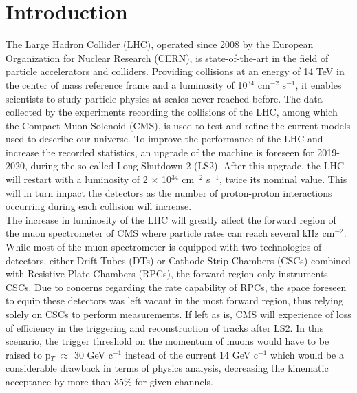 \chapter*{Introduction}
\label{chap:0-4-introduction}

  \vspace{2cm}

  The Large Hadron Collider (LHC), operated since 2008 by the European Organization for Nuclear Research (CERN), is state-of-the-art in the field of particle accelerators and colliders. Providing collisions at an energy of 14 TeV in the center of mass reference frame and a luminosity of 10$^{34}$ cm$^{-2}$ s$^{-1}$, it enables scientists to study particle physics at scales never reached before. The data collected by the experiments recording the collisions of the LHC, among which the Compact Muon Solenoid (CMS), is used to test and refine the current models used to describe our universe. To improve the performance of the LHC and increase the recorded statistics, an upgrade of the machine is foreseen for 2019-2020, during the so-called Long Shutdown 2 (LS2). After this upgrade, the LHC will restart with a luminosity of 2 $\times$ 10$^{34}$ cm$^{-2}$ s$^{-1}$, twice its nominal value. This will in turn impact the detectors as the number of proton-proton interactions occurring during each collision will increase. \\

  The increase in luminosity of the LHC will greatly affect the forward region of the muon spectrometer of CMS where particle rates can reach several kHz cm$^{-2}$. While most of the muon  spectrometer is equipped with two technologies of detectors, either Drift Tubes (DTs) or Cathode Strip Chambers (CSCs) combined with Resistive Plate Chambers (RPCs), the forward region only instruments CSCs. Due to concerns regarding the rate capability of RPCs, the space foreseen to equip these detectors was left vacant in the most forward region, thus relying solely on CSCs to perform measurements. If left as is, CMS will experience of loss of efficiency in the triggering and reconstruction of tracks after LS2. In this scenario, the trigger threshold on the momentum of muons would have to be raised to p$_T$ $ \approx $ 30 GeV c$^{-1}$ instead of the current 14 GeV c$^{-1}$ which would be a considerable drawback in terms of physics analysis, decreasing the kinematic acceptance by more than 35\% for given channels. \\

